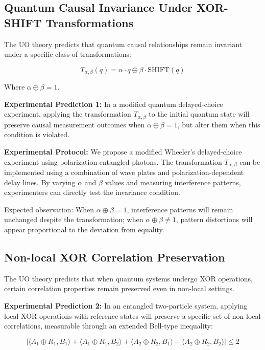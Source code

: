 \subsection{Quantum Causal Invariance Under XOR-SHIFT Transformations}

The UO theory predicts that quantum causal relationships remain invariant under a specific class of transformations:

\begin{equation}
T_{\alpha,\beta}(q) = \alpha \cdot q \oplus \beta \cdot \text{SHIFT}(q)
\end{equation}

Where $\alpha \oplus \beta = 1$.

\textbf{Experimental Prediction 1:} In a modified quantum delayed-choice experiment, applying the transformation $T_{\alpha,\beta}$ to the initial quantum state will preserve causal measurement outcomes when $\alpha \oplus \beta = 1$, but alter them when this condition is violated.

\textbf{Experimental Protocol:} We propose a modified Wheeler's delayed-choice experiment using polarization-entangled photons. The transformation $T_{\alpha,\beta}$ can be implemented using a combination of wave plates and polarization-dependent delay lines. By varying $\alpha$ and $\beta$ values and measuring interference patterns, experimenters can directly test the invariance condition.

Expected observation: When $\alpha \oplus \beta = 1$, interference patterns will remain unchanged despite the transformation; when $\alpha \oplus \beta \neq 1$, pattern distortions will appear proportional to the deviation from equality.

\subsection{Non-local XOR Correlation Preservation}

The UO theory predicts that when quantum systems undergo XOR operations, certain correlation properties remain preserved even in non-local settings.

\textbf{Experimental Prediction 2:} In an entangled two-particle system, applying local XOR operations with reference states will preserve a specific set of non-local correlations, measurable through an extended Bell-type inequality:

\begin{equation}
|\langle A_1 \oplus R_1, B_1 \rangle + \langle A_1 \oplus R_1, B_2 \rangle + \langle A_2 \oplus R_2, B_1 \rangle - \langle A_2 \oplus R_2, B_2 \rangle| \leq 2
\end{equation}

